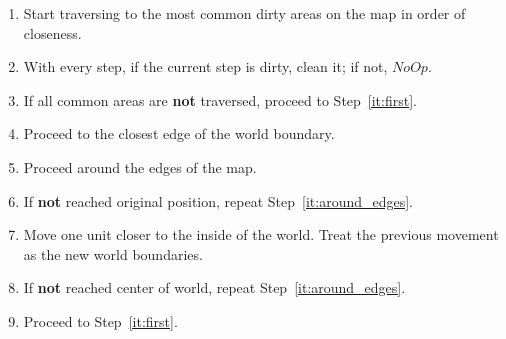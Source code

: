 \documentclass[12pt]{scrartcl}
\begin{document}
\begin{enumerate}
    \item\label{it:first} Start traversing to the most common dirty areas on the map in order of closeness.
    \item With every step, if the current step is dirty, clean it; if not, $NoOp$.
    \item If all common areas are \textbf{not} traversed, proceed to Step~\ref{it:first}.
    \item Proceed to the closest edge of the world boundary.
    \item\label{it:around_edges} Proceed around the edges of the map.
    \item If \textbf{not} reached original position, repeat Step~\ref{it:around_edges}.
    \item Move one unit closer to the inside of the world. Treat the previous movement as the new world boundaries.
    \item If \textbf{not} reached center of world, repeat Step~\ref{it:around_edges}.
    \item Proceed to Step~\ref{it:first}.
\end{enumerate}
\end{document}
